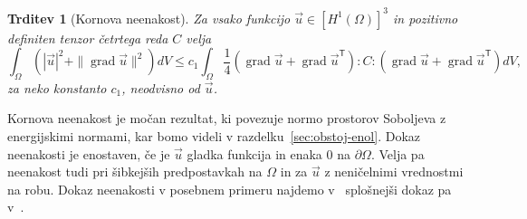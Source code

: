 \documentclass[12pt,a4paper,twoside]{article}
\theoremstyle{definition} %
\theoremstyle{plain} %
\newtheorem{trditev}[definicija]{Trditev}
\numberwithin{equation}{section}
\newcommand{\T}{\mathsf{T}}
\newcommand{\grad}{\operatorname{grad}}
\newcommand{\vu}{\vec{u}}
\begin{document}


\begin{trditev}[Kornova neenakost]
  \label{trd:korn}
  Za vsako funkcijo $\vu \in [H^1(\Omega)]^3$ in pozitivno definiten tenzor četrtega reda $C$ velja
  \begin{equation}
     \int_{\Omega} (|\vu|^2 + \|\grad \vu\|^2) dV \leq c_1 \int_{\Omega}  \frac14 (\grad \vu + \grad
     \vu^\T) :C: (\grad \vu + \grad \vu^\T)dV,
  \end{equation}
  za neko konstanto $c_1$, neodvisno od $\vu$.
\end{trditev}
Kornova neenakost je močan rezultat, ki povezuje normo prostorov Soboljeva z
energijskimi normami, kar bomo videli v razdelku~\ref{sec:obstoj-enol}. Dokaz neenakosti je
enostaven, če je $\vu$ gladka funkcija in enaka 0 na $\partial\Omega$. Velja pa neenakost tudi pri
šibkejših predpostavkah na $\Omega$ in za $\vu$ z neničelnimi vrednostmi na robu.
Dokaz neenakosti v posebnem primeru najdemo v~\cite[str.\ 229]{lebedev2009introduction} splošnejši
dokaz pa v~\cite{ciarlet2010korn}.
\end{document}
